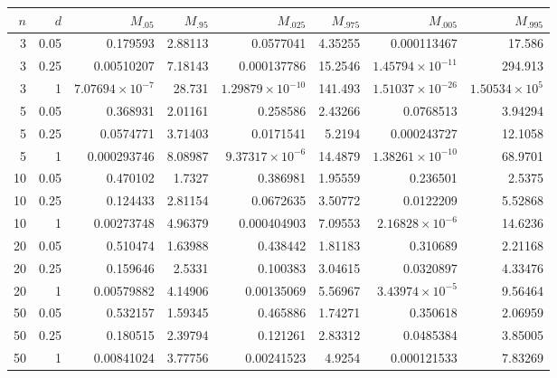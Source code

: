 \begin{tabular}{rrrrrrrr}
\toprule
$n$ & $d$ & $M_{.05}$ & $M_{.95}$ & $M_{.025}$ & $M_{.975}$ & $M_{.005}$ & $M_{.995}$ \\
\midrule
3 & 0.05 & 0.179593 & 2.88113 & 0.0577041 & 4.35255 & 0.000113467 & 17.586 \\
3 & 0.25 & 0.00510207 & 7.18143 & 0.000137786 & 15.2546 & $1.45794\times10^{-11}$ & 294.913 \\
3 & 1 & $7.07694\times10^{-7}$ & 28.731 & $1.29879\times10^{-10}$ & 141.493 & $1.51037\times10^{-26}$ & $1.50534\times10^{5}$ \\
5 & 0.05 & 0.368931 & 2.01161 & 0.258586 & 2.43266 & 0.0768513 & 3.94294 \\
5 & 0.25 & 0.0574771 & 3.71403 & 0.0171541 & 5.2194 & 0.000243727 & 12.1058 \\
5 & 1 & 0.000293746 & 8.08987 & $9.37317\times10^{-6}$ & 14.4879 & $1.38261\times10^{-10}$ & 68.9701 \\
10 & 0.05 & 0.470102 & 1.7327 & 0.386981 & 1.95559 & 0.236501 & 2.5375 \\
10 & 0.25 & 0.124433 & 2.81154 & 0.0672635 & 3.50772 & 0.0122209 & 5.52868 \\
10 & 1 & 0.00273748 & 4.96379 & 0.000404903 & 7.09553 & $2.16828\times10^{-6}$ & 14.6236 \\
20 & 0.05 & 0.510474 & 1.63988 & 0.438442 & 1.81183 & 0.310689 & 2.21168 \\
20 & 0.25 & 0.159646 & 2.5331 & 0.100383 & 3.04615 & 0.0320897 & 4.33476 \\
20 & 1 & 0.00579882 & 4.14906 & 0.00135069 & 5.56967 & $3.43974\times10^{-5}$ & 9.56464 \\
50 & 0.05 & 0.532157 & 1.59345 & 0.465886 & 1.74271 & 0.350618 & 2.06959 \\
50 & 0.25 & 0.180515 & 2.39794 & 0.121261 & 2.83312 & 0.0485384 & 3.85005 \\
50 & 1 & 0.00841024 & 3.77756 & 0.00241523 & 4.9254 & 0.000121533 & 7.83269 \\
\bottomrule
\end{tabular}
